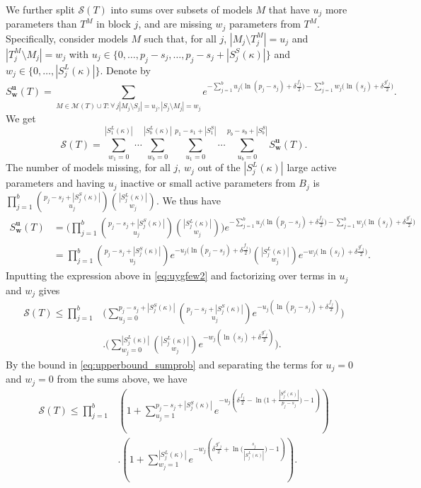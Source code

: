 \documentclass[bj,authoryear]{imsart}
\theoremstyle{plain}
\newcommand{\M}{\mathcal{M}}
\newcommand{\bs}{\boldsymbol}
\begin{document}
We further split $\mathcal{S}(T)$ into sums over subsets of models $M$ that have $u_j$ more parameters than $T^M$ in block $j$, and are missing $w_j$ parameters from $T^M$.
Specifically, consider models $M$ such that, for all $j$, $|M_j\setminus T^M_j|=u_j$ and $|T^M_j\setminus M_j|=w_j$ with $u_j \in \{0,\ldots,p_j-s_j,\ldots,p_j-s_j+|S_j^{S}(\kappa)|\}$ and $w_j \in \{0,\ldots,|S^{L}_j(\kappa)|\}$. Denote by
$$S^{\bs u}_{\bs w}(T)=\sum_{M \in \M(T) \cup T:\forall \,j |M_j\setminus S_j|=u_j, |S_j\setminus M_j|=w_j } e^{- \sum_{j=1}^b u_j\big(\ln(p_j-s_j)+\delta \tfrac{f_j}{2}\big)-\sum_{j=1}^b w_j\big(\ln(s_j)+\delta \tfrac{g'_j}{2}\big)}.$$
We get
\begin{equation}\label{eq:uygfew2}
    \mathcal{S}(T)=\sum_{w_1=0}^{|S^L_1(\kappa)|}\cdots\sum_{w_b=0}^{|S^L_b(\kappa)|}\sum_{u_1=0}^{p_1-s_1+|S_1^S|}\cdots\sum_{u_b=0}^{p_b-s_b+|S_b^S|}S^{\bs u}_{\bs w}(T).
\end{equation}
The number of models missing, for all $j$, $w_j$ out of the $|S^L_j(\kappa)|$ large active parameters and having $u_j$ inactive or small active parameters from $B_j$ is $\prod_{j=1}^b {\binom{p_j-s_j+|S^S_j(\kappa)|}{u_j}}{\binom{|S^L_j(\kappa)|}{w_j}}$. We thus have
\begin{align*}
    S^{\bs u}_{\bs w}(T)&= \bigg(\prod_{j=1}^b {\binom{p_j-s_j+|S^S_j(\kappa)|}{u_j}}{\binom{|S^L_j(\kappa)|}{w_j}}\bigg)e^{- \sum_{j=1}^b u_j\big(\ln(p_j-s_j)+\delta \tfrac{f_j}{2}\big)-\sum_{j=1}^b w_j\big(\ln(s_j)+\delta \tfrac{g'_j}{2}\big)} \\
    &= \prod_{j=1}^b {\binom{p_j-s_j+|S^S_j(\kappa)|}{u_j}}e^{- u_j\big(\ln(p_j-s_j)+\delta \tfrac{f_j}{2}\big)}{\binom{|S^L_j(\kappa)|}{w_j}}e^{-w_j\big(\ln(s_j)+\delta \tfrac{g'_j}{2}\big)}.
\end{align*}
Inputting the expression above in \eqref{eq:uygfew2} and factorizing over terms in $u_j$ and $w_j$ gives
\begin{align*}
    \mathcal{S}(T)\leq\prod_{j=1}^b & \Bigg(\sum_{u_j=0}^{p_j-s_j+|S^S_j(\kappa)|}{\binom{p_j-s_j+|S^S_j(\kappa)|}{u_j}}e^{- u_j(\ln(p_j-s_j)+\delta \tfrac{f_j}{2})}\Bigg)\\&.\Bigg(
    \sum_{w_j=0}^{|S^L_j(\kappa)|}{\binom{|S^L_j(\kappa)|}{w_j}}
    e^{-w_j(\ln(s_j)+\delta \tfrac{g'_j}{2})}\Bigg).
\end{align*}
By the bound in \eqref{eq:upperbound_sumprob} and separating the terms for $u_j=0$ and $w_j=0$ from the sums above, %
we have
\begin{align}\label{eq:ogr}
    \mathcal{S}(T)\leq\prod_{j=1}^b & \left(1+\sum_{u_j=1}^{p_j-s_j+|S_j^{S}(\kappa)|}e^{-u_j\left(\delta \tfrac{f_j}{2}-\ln\big(1+\frac{|S^{S}_j(\kappa)|}{p_j-s_j}\big)-1\right)}\right)\\&.\left(1+
    \sum_{w_j=1}^{|S_j^{L}(\kappa)|}    e^{-w_j\left(\delta \tfrac{g'_j}{2}+\ln\big(\frac{s_j}{|S_j^{L}(\kappa)|}\big)-1\right)}\right).\nonumber
\end{align}
\end{document}
